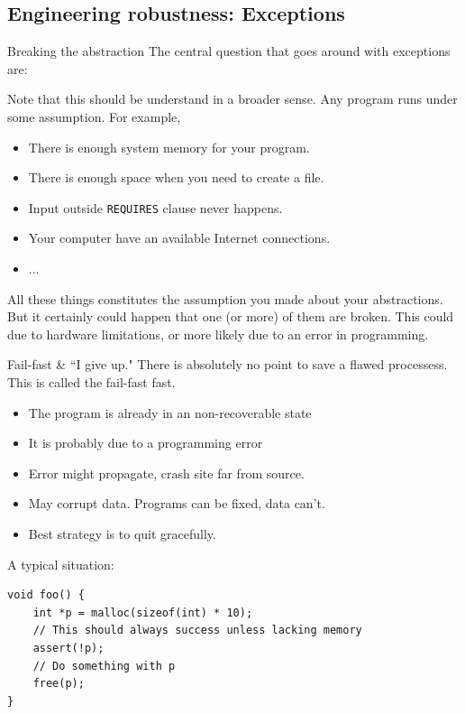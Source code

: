\subsection{Engineering robustness: Exceptions}
\begin{frame}{Breaking the abstraction}
The central question that goes around with exceptions are:
\begin{center}
\end{center}
Note that this should be understand in a broader sense. Any program runs under some assumption. For example, 
\begin{itemize}
	\item There is enough system memory for your program.
	\item There is enough space when you need to create a file.
	\item Input outside \texttt{REQUIRES} clause never happens. 
	\item Your computer have an available Internet connections.
	\item ...
\end{itemize}
All these things constitutes the assumption you made about your abstractions. But it certainly could happen that one (or more) of them are broken. This could due to hardware limitations, or more likely due to an error in programming. 
\end{frame}

\begin{frame}[fragile]{Fail-fast \& ``I give up."}
\alert{There is absolutely no point to save a flawed processess}. This is called the fail-fast fast.
\begin{itemize}
	\item The program is already in an non-recoverable state
	\item It is probably due to a programming error
	\item Error might propagate, crash site far from source.
	\item May corrupt data. Programs can be fixed, data can't.
	\item Best strategy is to quit gracefully.
\end{itemize}
A typical situation:
\begin{verbatim}
void foo() {
	int *p = malloc(sizeof(int) * 10);
	// This should always success unless lacking memory
	assert(!p);
	// Do something with p
	free(p);
}
\end{verbatim}
\end{frame}

